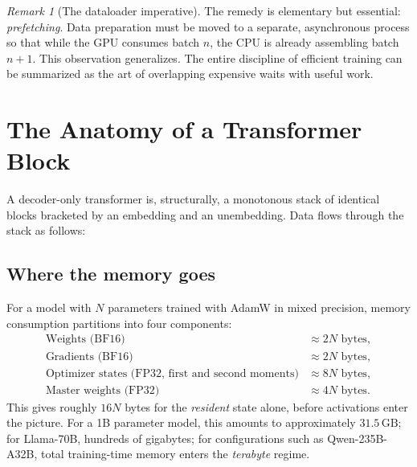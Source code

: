 \documentclass[11pt,a4paper]{article}
\theoremstyle{definition}
\theoremstyle{remark}
\newtheorem{remark}[definition]{Remark}
\theoremstyle{plain}
\newcommand{\GB}{\,\text{GB}}
\begin{document}
\begin{remark}[The dataloader imperative]
The remedy is elementary but essential: \emph{prefetching}. Data preparation must be moved to a separate, asynchronous process so that while the GPU consumes batch $n$, the CPU is already assembling batch $n+1$. This observation generalizes. The entire discipline of efficient training can be summarized as the art of overlapping expensive waits with useful work.
\end{remark}

\section{The Anatomy of a Transformer Block}
\label{sec:anatomy}

A decoder-only transformer is, structurally, a monotonous stack of identical blocks bracketed by an embedding and an unembedding. Data flows through the stack as follows:

\begin{center}
\end{center}

\subsection{Where the memory goes}

For a model with $N$ parameters trained with AdamW in mixed precision, memory consumption partitions into four components:
\begin{align}
\text{Weights (BF16)}    &\approx 2N \text{ bytes}, \\
\text{Gradients (BF16)}  &\approx 2N \text{ bytes}, \\
\text{Optimizer states (FP32, first and second moments)} &\approx 8N \text{ bytes}, \\
\text{Master weights (FP32)} &\approx 4N \text{ bytes}.
\end{align}
This gives roughly $16N$ bytes for the \emph{resident} state alone, before activations enter the picture. For a 1B parameter model, this amounts to approximately $31.5\GB$; for Llama-70B, hundreds of gigabytes; for configurations such as Qwen-235B-A32B, total training-time memory enters the \emph{terabyte} regime.
\end{document}
